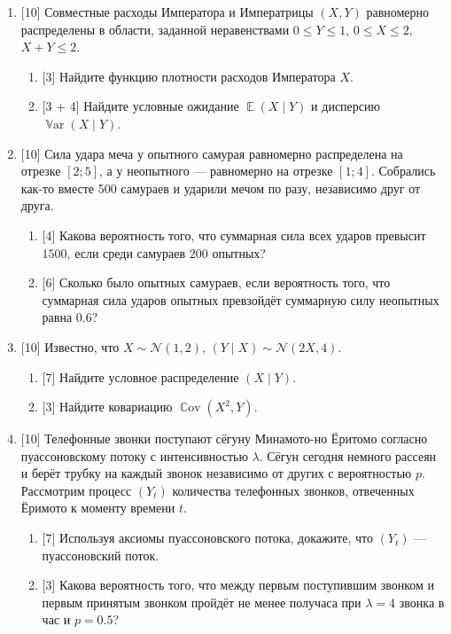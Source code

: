 \documentclass[12pt]{article}
\DeclareMathOperator{\Cov}{\mathbb{C}ov}
\DeclareMathOperator{\Var}{\mathbb{V}ar}
\DeclareMathOperator{\E}{\mathbb{E}}
\newcommand{\cN}{\mathcal{N}}
\begin{document}
\begin{enumerate}
    \item {[10]} Совместные расходы Императора и Императрицы $(X, Y)$ равномерно распределены в области, заданной неравенствами $0 \leq Y \leq 1$, $0 \leq X \leq 2$, $X + Y \leq 2$.
    
    \begin{enumerate}
        \item {[3]} Найдите функцию плотности расходов Императора $X$.
        \item {[3 + 4]} Найдите условные ожидание $\E(X \mid Y)$ и дисперсию $\Var(X \mid Y)$.
    \end{enumerate}

    \item {[10]} Сила удара меча у опытного самурая равномерно распределена на отрезке $[2; 5]$,
    а у неопытного — равномерно на отрезке $[1; 4]$.
    Собрались как-то вместе 500 самураев и ударили мечом по разу, независимо друг от друга. 

    \begin{enumerate}
        \item {[4]} Какова вероятность того, что суммарная сила всех ударов превысит $1500$, если среди самураев $200$ опытных? 
        \item {[6]} Сколько было опытных самураев, если вероятность того, что суммарная сила ударов опытных превзойдёт суммарную силу неопытных равна $0.6$? 
    \end{enumerate}
    
    \item {[10]} Известно, что $X \sim \cN(1, 2)$, $(Y \mid X) \sim \cN(2X, 4)$.
    \begin{enumerate}
        \item {[7]} Найдите условное распределение $(X \mid Y)$.
        \item {[3]} Найдите ковариацию $\Cov(X^2, Y)$.
    \end{enumerate}
    
    \item {[10]} Телефонные звонки поступают сёгуну Минамото-но Ёритомо согласно пуассоновскому потоку с интенсивностью $\lambda$. 
    Сёгун сегодня немного рассеян и берёт трубку на каждый звонок независимо от других с вероятностью $p$.
    Рассмотрим процесс $(Y_t)$ количества телефонных звонков, отвеченных Ёримото к моменту времени $t$.
    \begin{enumerate}
        \item {[7]} Используя аксиомы пуассоновского потока, докажите, что $(Y_t)$ — пуассоновский поток.
        \item {[3]} Какова вероятность того, что между первым поступившим звонком и первым принятым звонком пройдёт не менее получаса при $\lambda = 4$ звонка в час и $p = 0.5$?
    \end{enumerate}
    

\end{enumerate}
\end{document}
